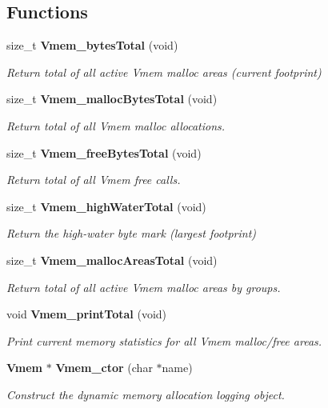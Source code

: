 \subsection*{Functions}
\begin{DoxyCompactItemize}
\item 
size\+\_\+t {\bf Vmem\+\_\+bytes\+Total} (void)
\begin{DoxyCompactList}\small\item\em Return total of all active Vmem malloc areas (current footprint) \end{DoxyCompactList}\item 
size\+\_\+t {\bf Vmem\+\_\+malloc\+Bytes\+Total} (void)
\begin{DoxyCompactList}\small\item\em Return total of all Vmem malloc allocations. \end{DoxyCompactList}\item 
size\+\_\+t {\bf Vmem\+\_\+free\+Bytes\+Total} (void)
\begin{DoxyCompactList}\small\item\em Return total of all Vmem free calls. \end{DoxyCompactList}\item 
size\+\_\+t {\bf Vmem\+\_\+high\+Water\+Total} (void)
\begin{DoxyCompactList}\small\item\em Return the high-\/water byte mark (largest footprint) \end{DoxyCompactList}\item 
size\+\_\+t {\bf Vmem\+\_\+malloc\+Areas\+Total} (void)
\begin{DoxyCompactList}\small\item\em Return total of all active Vmem malloc areas by groups. \end{DoxyCompactList}\item 
void {\bf Vmem\+\_\+print\+Total} (void)
\begin{DoxyCompactList}\small\item\em Print current memory statistics for all Vmem malloc/free areas. \end{DoxyCompactList}\item 
{\bf Vmem} $\ast$ {\bf Vmem\+\_\+ctor} (char $\ast$name)
\begin{DoxyCompactList}\small\item\em Construct the dynamic memory allocation logging object. \end{DoxyCompactList}\item 

\end{DoxyCompactItemize}
